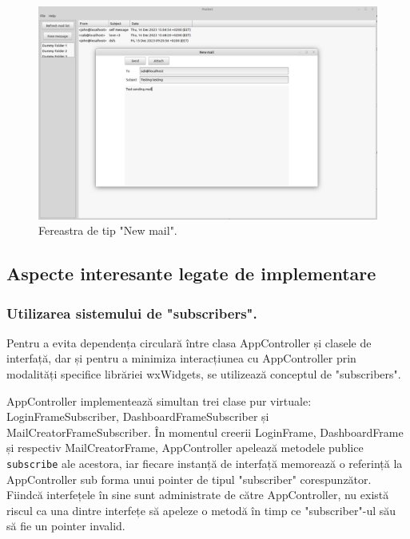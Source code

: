 \documentclass[runningheads]{llncs}
\begin{document}
\begin{figure}
    \centering
    \includegraphics[width=\textwidth]{poshetSend.png}
    \caption{Fereastra de tip "New mail".}
    \label{fig:poshetend}
\end{figure}

\subsection{Aspecte interesante legate de implementare}

\subsubsection{Utilizarea sistemului de "subscribers".} Pentru a evita dependența circulară între clasa AppController și clasele de interfață, dar și pentru a minimiza interacțiunea cu AppController prin modalități specifice librăriei wxWidgets, se utilizează conceptul de "subscribers".

AppController implementează simultan trei clase pur virtuale: LoginFrameSubscriber, DashboardFrameSubscriber și MailCreatorFrameSubscriber. În momentul creerii LoginFrame, DashboardFrame și respectiv MailCreatorFrame, AppController apelează metodele publice \texttt{subscribe} ale acestora, iar fiecare instanță de interfață memorează o referință la AppController sub forma unui pointer de tipul "subscriber" corespunzător. Fiindcă interfețele în sine sunt administrate de către AppController, nu există riscul ca una dintre interfețe să apeleze o metodă în timp ce "subscriber"-ul său să fie un pointer invalid.
\end{document}
